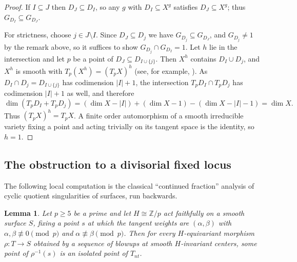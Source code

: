 \documentclass[11pt]{amsart}
\theoremstyle{plain}
\newtheorem{lemma}[theorem]{Lemma}
\theoremstyle{definition}
\theoremstyle{remark}
\numberwithin{equation}{section}
\begin{document}
\begin{proof}
If $I \subseteq J$ then $D_J \subseteq D_I$, so any $g$ with
$D_I \subseteq X^g$ satisfies $D_J \subseteq X^g$; thus
$G_{D_I} \subseteq G_{D_J}$.

For strictness, choose $j \in J \setminus I$.  Since $D_J \subseteq D_j$ we
have $G_{D_j} \subseteq G_{D_J}$, and $G_{D_j} \neq 1$ by the remark above,
so it suffices to show $G_{D_j} \cap G_{D_I} = 1$.
Let $h$ lie in the intersection and let $p$ be a point of
$D_J \subseteq D_{I \cup \{j\}}$.  Then $X^h$ contains $D_I \cup D_j$, and
$X^h$ is smooth with $T_p(X^h) = (T_pX)^h$ (see, for
example, \cite[Lemma~4.2]{ReichsteinYoussin}).  As
$D_I \cap D_j = D_{I \cup \{j\}}$ has codimension $|I| + 1$, the
intersection $T_p D_I \cap T_p D_j$ has codimension $|I| + 1$ as well, and
therefore
\[
\dim (T_p D_I + T_p D_j)
= (\dim X - |I|) + (\dim X - 1) - (\dim X - |I| - 1)
= \dim X .
\]
Thus $(T_pX)^h = T_pX$.  A finite order automorphism of a smooth
irreducible variety fixing a point and acting trivially on its tangent
space is the identity, so $h = 1$.
\end{proof}

\subsection*{The obstruction to a divisorial fixed locus}

The following local computation is the classical ``continued fraction''
analysis of cyclic quotient singularities of surfaces, run backwards.

\begin{lemma} \label{lem:game}
Let $p \geq 5$ be a prime and let $H \cong \mathbb{Z}/p$ act faithfully on a
smooth surface $S$, fixing a point $s$ at which the tangent weights are
$(\alpha,\beta)$ with $\alpha, \beta \not\equiv 0 \pmod p$ and
$\alpha \not\equiv \beta \pmod p$.  Then for every $H$-equivariant morphism
$\rho : T \to S$ obtained by a sequence of blowups at smooth $H$-invariant
centers, some point of $\rho^{-1}(s)$ is an isolated point of $T_{nt}$.
\end{lemma}
\end{document}

